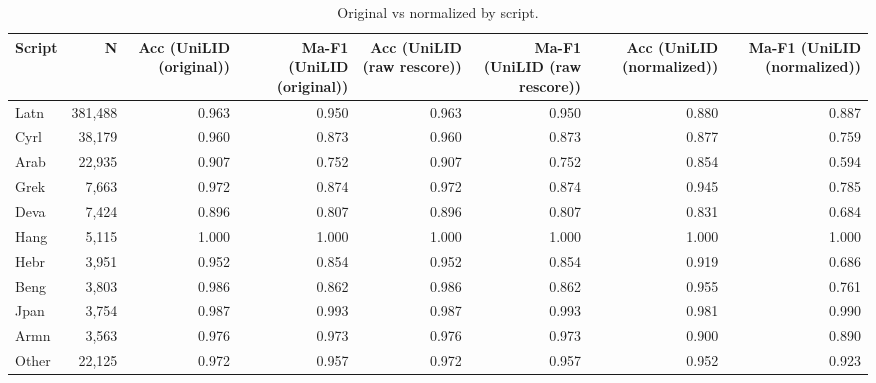 \begin{table}[htbp]
\centering
\small
\begin{tabular}{lrrrrrrr}
\toprule
\textbf{Script} & \textbf{N} & \textbf{Acc (UniLID (original))} & \textbf{Ma-F1 (UniLID (original))} & \textbf{Acc (UniLID (raw rescore))} & \textbf{Ma-F1 (UniLID (raw rescore))} & \textbf{Acc (UniLID (normalized))} & \textbf{Ma-F1 (UniLID (normalized))} \\
\midrule
Latn & 381,488 & 0.963 & 0.950 & 0.963 & 0.950 & 0.880 & 0.887 \\
Cyrl & 38,179 & 0.960 & 0.873 & 0.960 & 0.873 & 0.877 & 0.759 \\
Arab & 22,935 & 0.907 & 0.752 & 0.907 & 0.752 & 0.854 & 0.594 \\
Grek & 7,663 & 0.972 & 0.874 & 0.972 & 0.874 & 0.945 & 0.785 \\
Deva & 7,424 & 0.896 & 0.807 & 0.896 & 0.807 & 0.831 & 0.684 \\
Hang & 5,115 & 1.000 & 1.000 & 1.000 & 1.000 & 1.000 & 1.000 \\
Hebr & 3,951 & 0.952 & 0.854 & 0.952 & 0.854 & 0.919 & 0.686 \\
Beng & 3,803 & 0.986 & 0.862 & 0.986 & 0.862 & 0.955 & 0.761 \\
Jpan & 3,754 & 0.987 & 0.993 & 0.987 & 0.993 & 0.981 & 0.990 \\
Armn & 3,563 & 0.976 & 0.973 & 0.976 & 0.973 & 0.900 & 0.890 \\
Other & 22,125 & 0.972 & 0.957 & 0.972 & 0.957 & 0.952 & 0.923 \\
\bottomrule
\end{tabular}
\caption{Original vs normalized by script.}
\label{tab:norm-script}
\end{table}